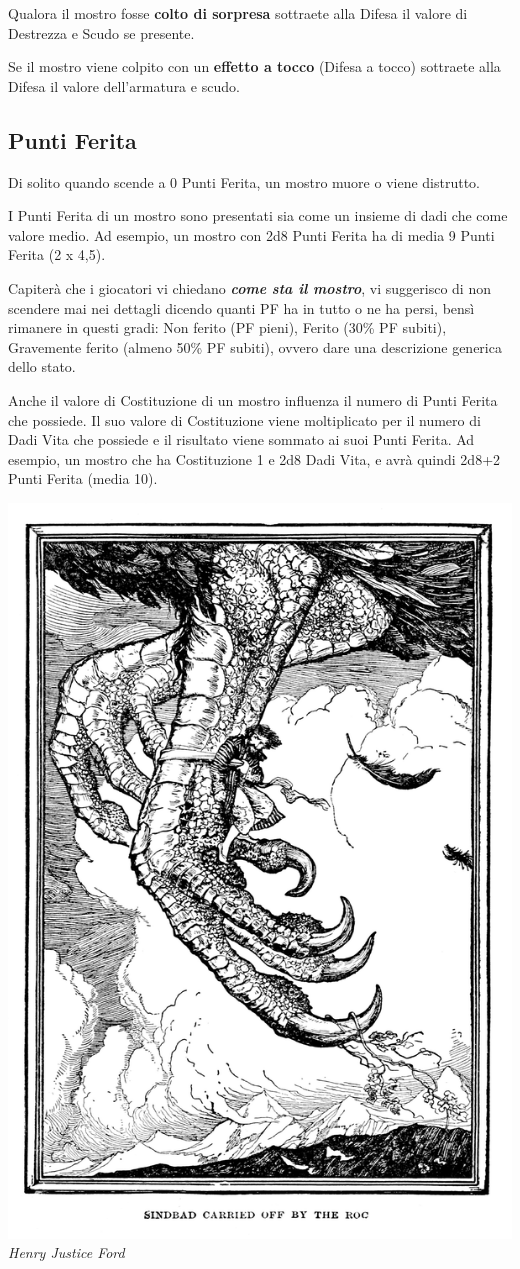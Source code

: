 \begin{multicols}{2}
Qualora il mostro fosse \textbf{colto di sorpresa} sottraete alla Difesa il valore di Destrezza e Scudo se presente.

Se il mostro viene colpito con un \textbf{effetto a tocco} (Difesa a tocco) sottraete alla Difesa il valore dell'armatura e scudo.

\subsection{Punti Ferita}

Di solito quando scende a 0 Punti Ferita, un mostro muore o viene distrutto.

I Punti Ferita di un mostro sono presentati sia come un insieme di dadi che come valore medio. Ad esempio, un mostro con 2d8 Punti Ferita ha di media 9 Punti Ferita (2 x 4,5).

Capiterà che i giocatori vi chiedano \textbf{\textit{come sta il mostro}}, vi suggerisco di non scendere mai nei dettagli dicendo quanti PF ha in tutto o ne ha persi, bensì rimanere in questi gradi:  Non ferito (PF pieni), Ferito (30\% PF subiti), Gravemente ferito (almeno 50\% PF subiti), ovvero dare una descrizione generica dello stato. 

Anche il valore di Costituzione di un mostro influenza il numero di Punti Ferita che possiede. Il suo valore di Costituzione viene moltiplicato per il numero di Dadi Vita che possiede e il risultato viene sommato ai suoi Punti Ferita. Ad esempio, un mostro che ha Costituzione 1 e 2d8 Dadi Vita, e avrà quindi 2d8+2 Punti Ferita (media 10).

\begin{center}
	\includegraphics[width=0.65\linewidth]{immagini/roc.png}\\
	\textit{Henry Justice Ford}
\end{center}


\end{multicols}
